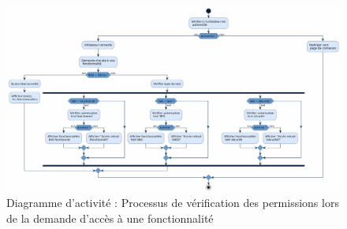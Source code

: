 \begin{enumerate}[label=\alph*), left=-0.1cm]
\begin{itemize}[label=, left=-0.1cm]
\begin{figure}[H]
        \includegraphics[width=\linewidth]{chapitres/ch3Sp1/section/sprint1/img/permission-activite.png}
        \caption{\centering Diagramme d’activité : Processus de vérification des permissions lors de la demande d’accès à une fonctionnalité}
        \label{fig:permission-activite}
    \end{figure}
    \end{itemize}
    \vspace{-0.5cm}
\end{enumerate}